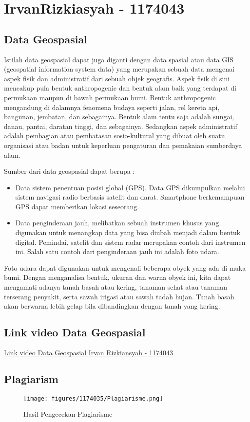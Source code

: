 \section{IrvanRizkiasyah - 1174043}
	\subsection{Data Geospasial}
	Istilah data geospasial dapat juga diganti dengan data spasial atau data GIS (geospatial information system data) yang merupakan sebuah data mengenai aspek fisik dan administratif dari sebuah objek geografis. Aspek fisik di sini mencakup pula bentuk anthropogenic dan bentuk alam baik yang terdapat di permukaan maupun di bawah permukaan bumi. Bentuk anthropogenic mengandung di dalamnya fenomena budaya seperti jalan, rel kereta api, bangunan, jembatan, dan sebagainya. Bentuk alam tentu saja adalah sungai, danau, pantai, daratan tinggi, dan sebagainya. Sedangkan aspek administratif adalah pembagian atau pembatasan sosio-kultural yang dibuat oleh suatu organisasi atau badan untuk keperluan pengaturan dan pemakaian sumberdaya alam.
	
	Sumber dari data geospasial dapat berupa :
	\begin{itemize}
		\item Data sistem penentuan posisi global (GPS). Data GPS dikumpulkan melalui sistem navigasi radio berbasis satelit dan darat. Smartphone berkemampuan GPS dapat memberikan lokasi seseorang.
		\item Data penginderaan jauh, melibatkan sebuah instrumen khusus yang digunakan untuk menangkap data yang bisa diubah menjadi dalam bentuk digital. Pemindai, satelit dan sistem radar merupakan contoh dari instrumen ini. Salah satu contoh dari penginderaan jauh ini adalah foto udara.
	\end{itemize}
	
	Foto udara dapat digunakan untuk mengenali beberapa obyek yang ada di muka bumi. Dengan menganalisa bentuk, ukuran dan warna obyek ini, kita dapat mengamati adanya tanah basah atau kering, tanaman sehat atau tanaman terserang penyakit, serta sawah irigasi atau sawah tadah hujan. Tanah basah akan berwarna lebih gelap bila dibandingkan dengan tanah yang kering.

	\subsection{Link video Data Geospasial}
		\href{https://youtu.be/w1NwuEcDHfA} {Link video Data Geospasial Irvan Rizkiansyah - 1174043}
		
	\subsection{Plagiarism}
	\begin{figure}[H]
		\texttt{[image: figures/1174035/Plagiarisme.png]}
		\centering
		\caption{Hasil Pengecekan Plagiarisme}
	\end{figure}
